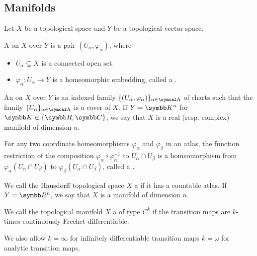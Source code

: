 \subsection{Manifolds}\label{subsec:manifolds}

\begin{definition}\label{def:atlas}\cite[definition 12.1]{Иванов2017}
  Let \( X \) be a topological space and \( Y \) be a topological vector space.

  A  on \( X \) over \( Y \) is a pair \( (U_\alpha, \varphi_\alpha) \), where
  \begin{itemize}
    \item \( U_\alpha \subseteq X \) is a connected open set.
    \item \( \varphi_\alpha: U_\alpha \to Y \) is a homeomorphic embedding, called a .
  \end{itemize}

  An  on \( X \) over \( Y \) is an indexed family \( \{ (U_\alpha, \varphi_\alpha) \}_{\alpha \in \A} \) of charts such that the family \( \{ U_\alpha \}_{\alpha \in \A} \) is a cover of \( X \). If \( Y = \K^n \) for \( \K \in \{ \R, \C \} \), we say that \( X \) is a real (resp. complex) manifold of dimension \( n \).

  For any two coordinate homeomorphisms \( \varphi_\alpha \) and \( \varphi_\beta \) in an atlas, the function restriction of the composition \( \varphi_\alpha \circ \varphi_\alpha^{-1} \) to \( U_\alpha \cap U_\beta \) is a homeomorphism from \( \varphi_\alpha(U_\alpha \cap U_\beta) \) to \( \varphi_\beta(U_\alpha \cap U_\beta) \), called a .
\end{definition}

\begin{definition}\label{def:topological_manifold}\cite[definition 12.4]{Иванов2017}
  We call the Hausdorff topological space \( X \) a  if it has a countable atlas. If \( Y = \R^n \), we say that \( X \) is a manifold of dimension \( n \).
\end{definition}

\begin{definition}\label{def:differentiable_manifold}\cite[definition 12.6]{Иванов2017}
  We call the topological manifold \( X \) a  of type \( C^k \) if the transition maps are \( k \)-times continuously Frechet differentiable.

  We also allow \( k = \infty \) for infinitely differentiable transition maps \( k = \omega \) for analytic transition maps.
\end{definition}
